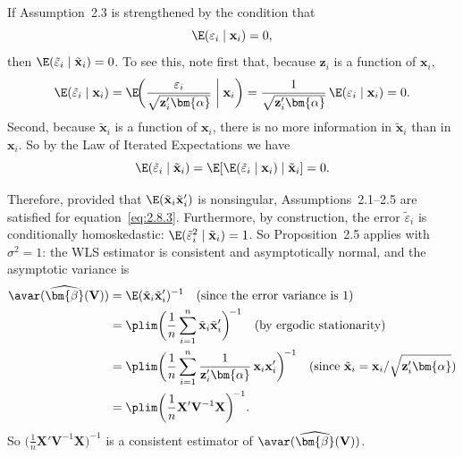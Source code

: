 If Assumption~2.3 is strengthened by the condition that
\begin{equation}
  \E(\varepsilon_i \mid \mathbf{x}_i) = 0,
  \label{eq:2.8.5}
\end{equation}
then $\E(\tilde{\varepsilon}_i \mid \tilde{\mathbf{x}}_i) = 0$.  To see this, note first
that, because $\mathbf{z}_i$ is a function of $\mathbf{x}_i$,
\begin{equation}
  \E(\tilde{\varepsilon}_i \mid \mathbf{x}_i)
    = \E\!\biggl(\frac{\varepsilon_i}{\sqrt{\mathbf{z}_i' \bm{\alpha}}}
      \biggm| \mathbf{x}_i\biggr)
    = \frac{1}{\sqrt{\mathbf{z}_i' \bm{\alpha}}}\,
      \E(\varepsilon_i \mid \mathbf{x}_i) = 0.
  \label{eq:2.8.6}
\end{equation}
Second, because $\tilde{\mathbf{x}}_i$ is a function of $\mathbf{x}_i$, there is no more
information in $\tilde{\mathbf{x}}_i$ than in $\mathbf{x}_i$.  So by the Law of Iterated
Expectations we have
\[
  \E(\tilde{\varepsilon}_i \mid \tilde{\mathbf{x}}_i)
    = \E[\E(\tilde{\varepsilon}_i \mid \mathbf{x}_i) \mid \tilde{\mathbf{x}}_i] = 0.
\]

Therefore, provided that
$\E(\tilde{\mathbf{x}}_i \tilde{\mathbf{x}}_i')$ is nonsingular, Assumptions~2.1--2.5
are satisfied for equation~\eqref{eq:2.8.3}.  Furthermore, by construction, the error
$\tilde{\varepsilon}_i$ is conditionally homoskedastic:
$\E(\tilde{\varepsilon}_i^2 \mid \tilde{\mathbf{x}}_i) = 1$.  So Proposition~2.5 applies
with $\sigma^2 = 1$: the WLS estimator is consistent and asymptotically normal, and the
asymptotic variance is
\begin{align}
  \avar(\widehat{\bm{\beta}}(\mathbf{V}))
    &= \E(\tilde{\mathbf{x}}_i \tilde{\mathbf{x}}_i')^{-1}
    \quad (\text{since the error variance is } 1) \notag \\
    &= \plim\biggl(\frac{1}{n} \sum_{i=1}^{n}
      \tilde{\mathbf{x}}_i \tilde{\mathbf{x}}_i'\biggr)^{\!-1}
    \quad (\text{by ergodic stationarity}) \notag \\
    &= \plim\biggl(\frac{1}{n} \sum_{i=1}^{n}
      \frac{1}{\mathbf{z}_i' \bm{\alpha}}\,
      \mathbf{x}_i \mathbf{x}_i'\biggr)^{\!-1}
    \quad (\text{since } \tilde{\mathbf{x}}_i
      = \mathbf{x}_i / \sqrt{\mathbf{z}_i' \bm{\alpha}}) \notag \\
    &= \plim\biggl(\frac{1}{n} \mathbf{X}' \mathbf{V}^{-1}
      \mathbf{X}\biggr)^{\!-1}.
  \label{eq:2.8.7}
\end{align}
So $\bigl(\frac{1}{n} \mathbf{X}' \mathbf{V}^{-1} \mathbf{X}\bigr)^{-1}$ is a
consistent estimator of $\avar(\widehat{\bm{\beta}}(\mathbf{V}))$.

